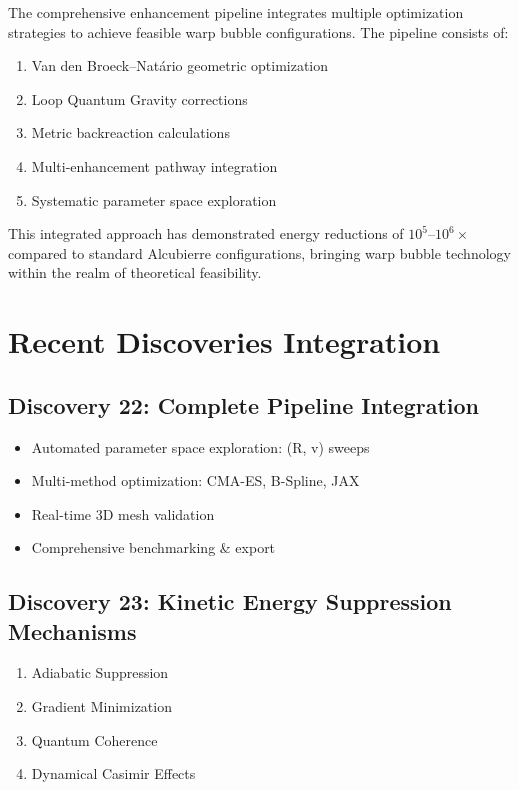 \documentclass{article}
\begin{document}
The comprehensive enhancement pipeline integrates multiple optimization strategies to achieve feasible warp bubble configurations. The pipeline consists of:

\begin{enumerate}
\item Van den Broeck–Natário geometric optimization
\item Loop Quantum Gravity corrections
\item Metric backreaction calculations
\item Multi-enhancement pathway integration
\item Systematic parameter space exploration
\end{enumerate}

This integrated approach has demonstrated energy reductions of $10^5$--$10^6\times$ compared to standard Alcubierre configurations, bringing warp bubble technology within the realm of theoretical feasibility.

\section{Recent Discoveries Integration}

\subsection{Discovery 22: Complete Pipeline Integration}
\begin{itemize}
  \item Automated parameter space exploration: (R, v) sweeps
  \item Multi-method optimization: CMA-ES, B-Spline, JAX
  \item Real-time 3D mesh validation
  \item Comprehensive benchmarking \& export
\end{itemize}

\subsection{Discovery 23: Kinetic Energy Suppression Mechanisms}
\begin{enumerate}
  \item Adiabatic Suppression
  \item Gradient Minimization
  \item Quantum Coherence
  \item Dynamical Casimir Effects
\end{enumerate}
\end{document}
